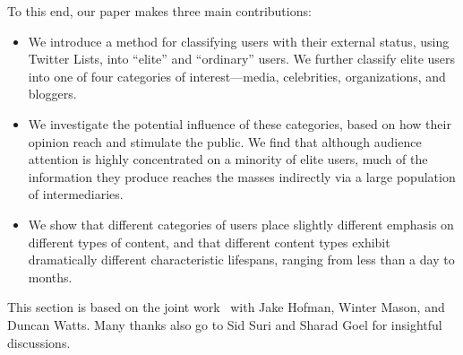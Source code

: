 \documentclass[phd,tocprelim]{cornell}
\begin{document}



To this end, our paper makes three main contributions:
\begin{itemize}
\item We introduce a method for classifying users with their external status, using Twitter
  Lists, into ``elite'' and ``ordinary'' users. We further classify elite users into one of four categories of interest---media,
  celebrities, organizations, and bloggers.
\item We investigate the potential influence of these categories, based on how their opinion reach and stimulate the public. We find that although audience attention is highly concentrated on a
  minority of elite users, much of the information they produce
  reaches the masses indirectly via a large population of
  intermediaries. %
\item We show that different categories of users place slightly
  different emphasis on different types of content, and that different
  content types exhibit dramatically different characteristic
  lifespans, ranging from less than a day to months.
\end{itemize}

This section is based on the joint work~\cite{Wu-Twitter-2011} with Jake Hofman, Winter Mason, and Duncan Watts. Many thanks also go to Sid Suri and Sharad Goel for insightful discussions.


\end{document}
